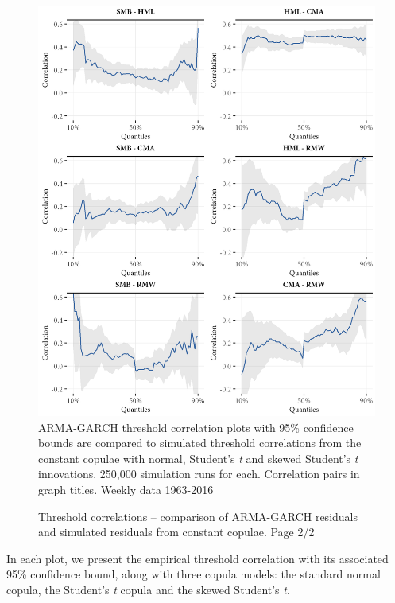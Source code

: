 \begin{figure}[htbp]
  \caption{Threshold correlations -- comparison of ARMA-GARCH residuals and simulated residuals from constant copulae. Page 2/2}
  \label{fig:threshold_simulated2}
  \centering
  \begin{minipage}{\textwidth}
  \includegraphics[scale=1]{graphics/threshold_simulated2.png}  
  \vspace{3mm}
  \footnotesize
  ARMA-GARCH threshold correlation plots with 95\% confidence bounds are compared to simulated threshold correlations from the constant copulae with normal, Student's \textit{t} and skewed Student's \textit{t} innovations. 250,000 simulation runs for each. Correlation pairs in graph titles. Weekly data 1963-2016
  \end{minipage}
\end{figure}
In each plot, we present the empirical threshold correlation with its associated 95\% confidence bound, along with three copula models: the standard normal copula, the Student's \textit{t} copula and the skewed Student's \textit{t}.

